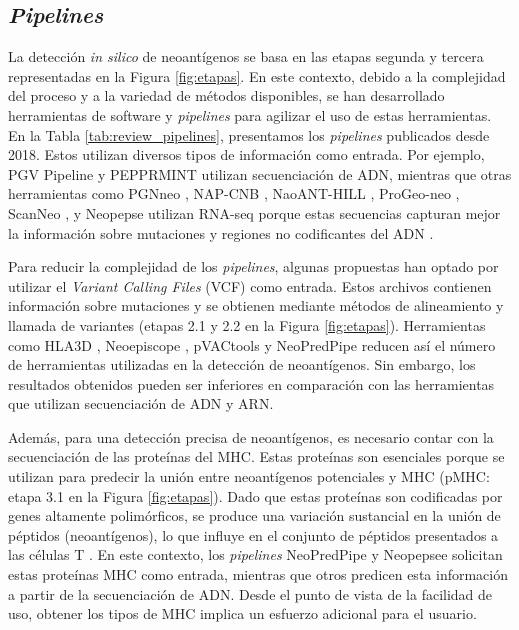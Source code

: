 \subsection{\textit{Pipelines}}

La detección \textit{in silico} de neoantígenos se basa en las etapas segunda y tercera representadas en la Figura \ref{fig:etapas}. En este contexto, debido a la complejidad del proceso y a la variedad de métodos disponibles, se han desarrollado herramientas de software y \textit{pipelines} para agilizar el uso de estas herramientas. En la Tabla \ref{tab:review_pipelines}, presentamos los \textit{pipelines} publicados desde 2018. Estos utilizan diversos tipos de información como entrada. Por ejemplo, PGV Pipeline \citep{rubinsteyn2018computational} y PEPPRMINT \citep{zhou2023prioritizing} utilizan secuenciación de ADN, mientras que otras herramientas como PGNneo \citep{tan2023pgnneo}, NAP-CNB \citep{wert2021predicting}, NaoANT-HILL \citep{coelho2020neoant}, ProGeo-neo \citep{li2020progeo}, ScanNeo \citep{wang2019scanneo}, y Neopepse \citep{kim2018neopepsee} utilizan RNA-seq porque estas secuencias capturan mejor la información sobre mutaciones y regiones no codificantes del ADN \citep{tan2023pgnneo}.

Para reducir la complejidad de los \textit{pipelines}, algunas propuestas han optado por utilizar el \textit{Variant Calling Files} (VCF) como entrada. Estos archivos contienen información sobre mutaciones y se obtienen mediante métodos de alineamiento y llamada de variantes (etapas 2.1 y 2.2 en la Figura \ref{fig:etapas}). Herramientas como HLA3D \citep{li2022hla3d}, Neoepiscope \citep{wood2020neoepiscope}, pVACtools \citep{hundal2020pvactools} y NeoPredPipe \citep{schenck2019neopredpipe} reducen así el número de herramientas utilizadas en la detección de neoantígenos. Sin embargo, los resultados obtenidos pueden ser inferiores en comparación con las herramientas que utilizan secuenciación de ADN y ARN.

Además, para una detección precisa de neoantígenos, es necesario contar con la secuenciación de las proteínas del  MHC. Estas proteínas son esenciales porque se utilizan para predecir la unión entre neoantígenos potenciales y MHC (pMHC: etapa 3.1 en la Figura \ref{fig:etapas}). Dado que estas proteínas son codificadas por genes altamente polimórficos, se produce una variación sustancial en la unión de péptidos (neoantígenos), lo que influye en el conjunto de péptidos presentados a las células T \citep{abualrous2021major}. En este contexto, los \textit{pipelines} NeoPredPipe \citep{schenck2019neopredpipe} y Neopepsee \citep{kim2018neopepsee} solicitan estas proteínas MHC como entrada, mientras que otros predicen esta información a partir de la secuenciación de ADN. Desde el punto de vista de la facilidad de uso, obtener los tipos de MHC implica un esfuerzo adicional para el usuario.

